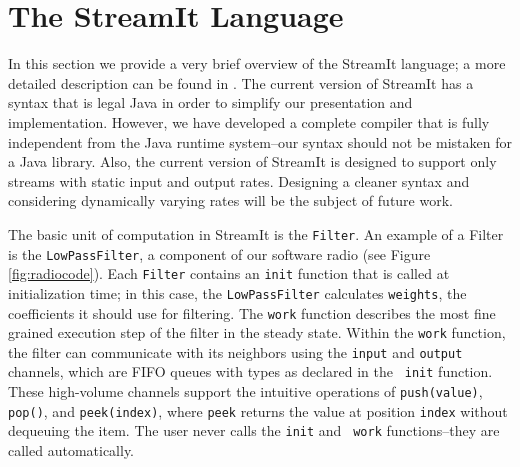 
\section{The StreamIt Language}
\label{sec:streamit}

In this section we provide a very brief overview of the StreamIt
language; a more detailed description can be found in
\cite{streamitcc}.  The current version of StreamIt has a syntax that
is legal Java in order to simplify our presentation and
implementation.  However, we have developed a complete compiler that
is fully independent from the Java runtime system--our syntax should
not be mistaken for a Java library.  Also, the current version of
StreamIt is designed to support only streams with static input and
output rates.  Designing a cleaner syntax and considering dynamically
varying rates will be the subject of future work.

The basic unit of computation in StreamIt is the {\tt Filter}.  An
example of a Filter is the {\tt LowPassFilter}, a component of our
software radio (see Figure \ref{fig:radiocode}).  Each {\tt Filter}
contains an {\tt init} function that is called at initialization time;
in this case, the {\tt LowPassFilter} calculates {\tt weights}, the
coefficients it should use for filtering.  The {\tt work} function
describes the most fine grained execution step of the filter in the
steady state.  Within the {\tt work} function, the filter can
communicate with its neighbors using the {\tt input} and {\tt output}
channels, which are FIFO queues with types as declared in the {\tt
init} function.  These high-volume channels support the intuitive
operations of {\tt push(value)}, {\tt pop()}, and {\tt peek(index)},
where {\tt peek} returns the value at position {\tt index} without
dequeuing the item.  The user never calls the {\tt init} and {\tt
work} functions--they are called automatically.


